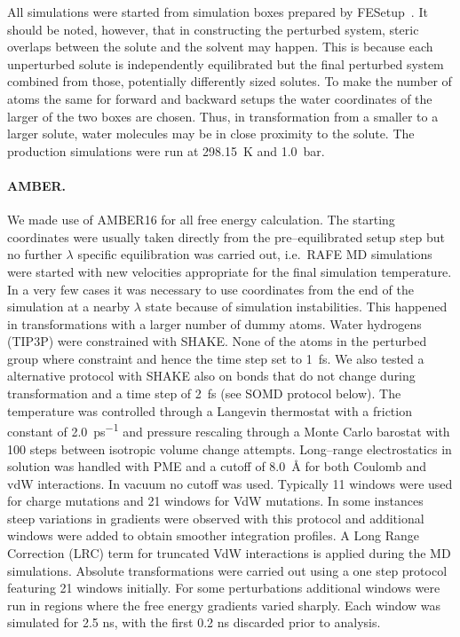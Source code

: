 \documentclass[journal=jctcce,manuscript=article]{achemso}
\begin{document}
All simulations were started from simulation boxes prepared by 
FESetup~\cite{loeffler_fesetup:_2015}.  It should be noted, however, that in 
constructing the perturbed system, steric overlaps between the solute and the 
solvent may happen.  This is because each unperturbed solute is independently 
equilibrated but the final perturbed system combined from those, potentially 
differently sized solutes.  To make the number of atoms the same for forward 
and backward setups the water coordinates of the larger of the two boxes are 
chosen.  Thus, in transformation from a smaller to a larger solute, water 
molecules may be in close proximity to the solute.  The production simulations 
were run at \SI{298.15}{K} and \SI{1.0}{bar}.

\paragraph{AMBER.} We made use of AMBER16 for all free energy calculation. The 
starting coordinates were usually taken directly from the pre--equilibrated 
setup step but no further $\lambda$ specific equilibration  was carried out, 
i.e.\ RAFE MD simulations were started with new velocities appropriate for the 
final simulation temperature.  In a very few cases it was necessary to use 
coordinates from the end of the simulation at a nearby $\lambda$ state because 
of simulation instabilities. This happened in transformations with a larger 
number of dummy atoms.  Water hydrogens (TIP3P) were constrained with SHAKE. 
None of the atoms in the perturbed group where constraint and hence the time 
step set to \SI{1}{fs}.  We also tested a alternative protocol with 
SHAKE also on bonds that do not change during transformation and a time step of 
\SI{2}{fs} (see SOMD protocol below). The temperature was controlled through a 
Langevin thermostat with a friction constant of \SI{2.0}{ps^{-1}} and pressure 
rescaling through a Monte Carlo barostat with 100 steps between isotropic 
volume change attempts.  Long--range electrostatics in solution was handled 
with PME and a cutoff of \SI{8.0}{\angstrom} for both Coulomb and vdW 
interactions.  In vacuum no cutoff was used. Typically 11 windows were used for charge mutations and 21 windows for VdW mutations. In some instances steep variations in gradients were observed with this protocol and additional windows were added to obtain smoother integration profiles. A Long Range Correction (LRC) term for truncated VdW interactions is applied during the MD simulations. Absolute transformations were carried out using a one step protocol featuring 21 windows initially. For some perturbations additional windows were run in regions where the free energy gradients varied sharply. Each window was simulated for 2.5 ns, with the first 0.2 ns discarded prior to analysis.
\end{document}
